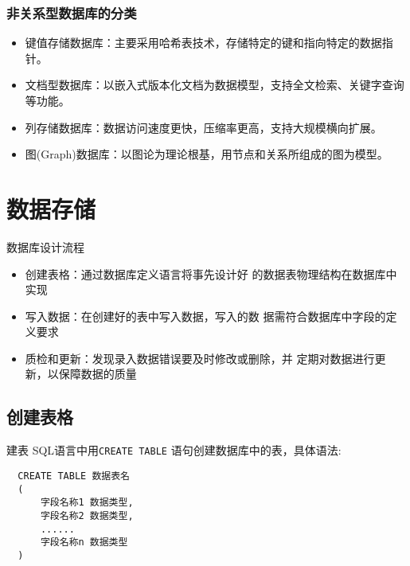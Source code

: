 \documentclass[t]{beamer}
\begin{document}
\begin{frame}
    \frametitle{非关系型数据库的分类}
\begin{itemize}
  \item 键值存储数据库：主要采用哈希表技术，存储特定的键和指向特定的数据指针。
  
  \item 文档型数据库：以嵌入式版本化文档为数据模型，支持全文检索、关键字查询等功能。
  
  \item 列存储数据库：数据访问速度更快，压缩率更高，支持大规模横向扩展。
  
  \item 图(Graph)数据库：以图论为理论根基，用节点和关系所组成的图为模型。
  
\end{itemize}
\end{frame}



\section{数据存储}
\begin{frame}{数据库设计流程}
\begin{itemize}
    \item 创建表格：通过数据库定义语言将事先设计好
    的数据表物理结构在数据库中实现
    \item 写入数据：在创建好的表中写入数据，写入的数
    据需符合数据库中字段的定义要求
    \item 质检和更新：发现录入数据错误要及时修改或删除，并
    定期对数据进行更新，以保障数据的质量
  \end{itemize}
\end{frame}




\subsection{创建表格}
\begin{frame}[fragile]{建表}
SQL语言中用\texttt{CREATE TABLE} 语句创建数据库中的表，具体语法:
  \begin{lstlisting}
  CREATE TABLE 数据表名
  (
      字段名称1 数据类型,
      字段名称2 数据类型, 
      ......
      字段名称n 数据类型
  )
\end{lstlisting}

\end{frame}
\end{document}
